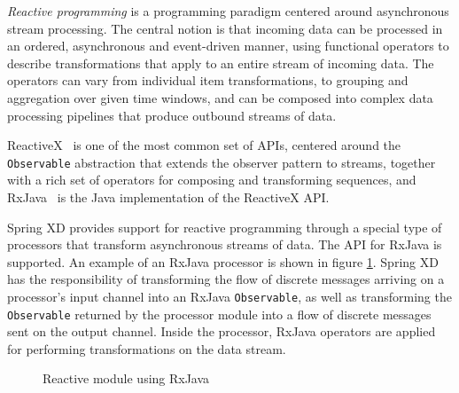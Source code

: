 \emph{Reactive programming} is a programming paradigm centered around asynchronous
stream processing. The central notion is that incoming data can be processed in an
ordered, asynchronous and event-driven manner, using functional operators to describe
transformations that apply to an entire stream of incoming data. The operators can
vary from individual item transformations, to grouping and aggregation over given
time windows, and can be composed into complex data processing pipelines that produce
outbound streams of data.

ReactiveX~\cite{reactivex} is one of the most common set of APIs, centered around
the \texttt{Observable} abstraction that extends the observer pattern to streams,
together with a rich set of operators for composing and transforming sequences, and
RxJava~\cite{rxjava} is the Java implementation of the ReactiveX API. 

Spring XD provides support for reactive programming \linebreak
through a special type of processors that transform asynchronous
streams of data. The API for RxJava is supported. An example of an RxJava 
processor is shown in figure \ref{fig:rxjava}.
Spring XD has the responsibility of transforming the 
flow of discrete messages arriving on a processor's input channel into an
RxJava \texttt{Observable}, as well as transforming the \texttt{Observable} 
returned by the processor module into a flow of discrete messages sent on 
the output channel. Inside the processor, RxJava operators are applied for 
performing transformations on the data stream.

\begin{figure}[ht]
\centering
{}
\caption{Reactive module using RxJava}
\label{fig:rxjava}
\end{figure}

